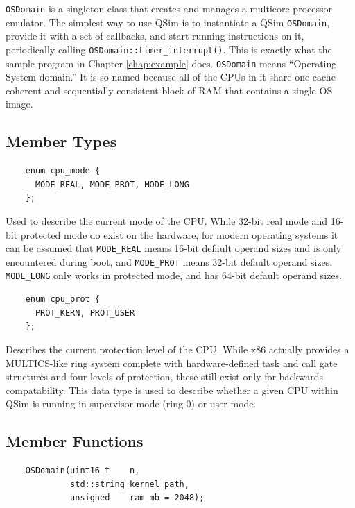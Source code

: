 \documentclass[letterpaper, 10pt]{book}
\begin{document}
\texttt{OSDomain} is a singleton class that creates and manages a multicore
processor emulator. The simplest way to use QSim is to instantiate a QSim
\texttt{OSDomain}, provide it with a set of callbacks, and start running instructions on it, periodically calling  \texttt{OSDomain::timer\_interrupt()}.
This is exactly what the sample program
in Chapter \ref{chap:example} does. \texttt{OSDomain} means ``Operating System
domain.'' It is so named because all of the CPUs in it share one cache coherent
and sequentially consistent block of RAM that contains a single OS image.

\subsection{Member Types}
\label{enum:cpu_mode} \begin{verbatim}
    enum cpu_mode {
      MODE_REAL, MODE_PROT, MODE_LONG
    };
\end{verbatim}

Used to describe the current mode of the CPU. While 32-bit real mode and 16-bit
protected mode do exist on the hardware, for modern operating systems it can be
assumed that \texttt{MODE\_REAL} means 16-bit default operand sizes and is only
encountered during boot, and \texttt{MODE\_PROT} means 32-bit default operand
sizes. \texttt{MODE\_LONG} only works in protected mode, and has 64-bit default
operand sizes.

\label{enum:cpu_prot} \begin{verbatim}
    enum cpu_prot {
      PROT_KERN, PROT_USER
    };
\end{verbatim}

Describes the current protection level of the CPU. While x86 actually provides
a MULTICS-like ring system complete with hardware-defined task and call gate
structures and four levels of protection, these still exist only for backwards
compatability. This data type is used to describe whether a given CPU within
QSim is running in supervisor mode (ring 0) or user mode.

\subsection{Member Functions}
\label{func:OSDomain} \begin{verbatim}
    OSDomain(uint16_t    n, 
             std::string kernel_path, 
             unsigned    ram_mb = 2048);
\end{verbatim}
\end{document}
